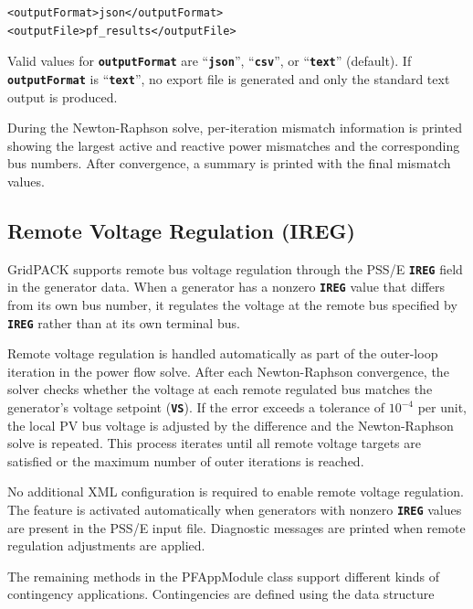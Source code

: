 {
\color{red}
\begin{Verbatim}[fontseries=b]
<outputFormat>json</outputFormat>
<outputFile>pf_results</outputFile>
\end{Verbatim}
}

Valid values for \texttt{\textbf{outputFormat}} are ``\texttt{\textbf{json}}'', ``\texttt{\textbf{csv}}'', or ``\texttt{\textbf{text}}'' (default). If \texttt{\textbf{outputFormat}} is ``\texttt{\textbf{text}}'', no export file is generated and only the standard text output is produced.

During the Newton-Raphson solve, per-iteration mismatch information is printed showing the largest active and reactive power mismatches and the corresponding bus numbers. After convergence, a summary is printed with the final mismatch values.

\subsection*{Remote Voltage Regulation (IREG)}

GridPACK supports remote bus voltage regulation through the PSS/E \texttt{\textbf{IREG}} field in the generator data. When a generator has a nonzero \texttt{\textbf{IREG}} value that differs from its own bus number, it regulates the voltage at the remote bus specified by \texttt{\textbf{IREG}} rather than at its own terminal bus.

Remote voltage regulation is handled automatically as part of the outer-loop iteration in the power flow solve. After each Newton-Raphson convergence, the solver checks whether the voltage at each remote regulated bus matches the generator's voltage setpoint (\texttt{\textbf{VS}}). If the error exceeds a tolerance of $10^{-4}$ per unit, the local PV bus voltage is adjusted by the difference and the Newton-Raphson solve is repeated. This process iterates until all remote voltage targets are satisfied or the maximum number of outer iterations is reached.

No additional XML configuration is required to enable remote voltage regulation. The feature is activated automatically when generators with nonzero \texttt{\textbf{IREG}} values are present in the PSS/E input file. Diagnostic messages are printed when remote regulation adjustments are applied.

The remaining methods in the PFAppModule class support different kinds of contingency applications. Contingencies are defined using the data structure

